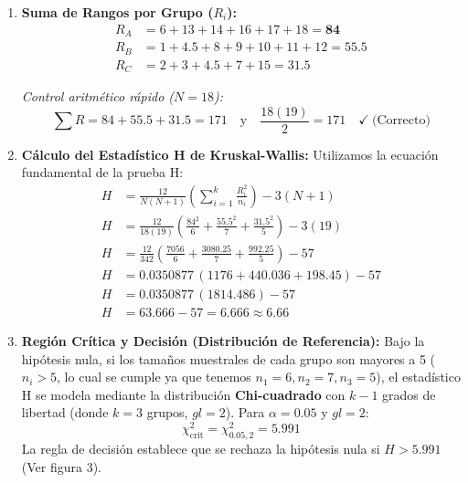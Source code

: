 \documentclass[10pt,a4paper]{article}
\begin{document}
\begin{enumerate}[leftmargin=18pt,itemsep=2pt,topsep=2pt,parsep=0pt]
  \item \textbf{Suma de Rangos por Grupo ($R_i$):}
  \begin{align*}
  R_A &= 6 + 13 + 14 + 16 + 17 + 18 = \mathbf{84} \\
  R_B &= 1 + 4.5 + 8 + 9 + 10 + 11 + 12 = \mathbf{55.5} \\
  R_C &= 2 + 3 + 4.5 + 7 + 15 = \mathbf{31.5}
  \end{align*}

  \textit{Control aritmético rápido ($N = 18$):}
  \[
  \sum R = 84 + 55.5 + 31.5 = 171
  \quad \text{y} \quad
  \frac{18(19)}{2} = 171 \quad \checkmark\ \text{(Correcto)}
  \]

  \item \textbf{Cálculo del Estadístico H de Kruskal-Wallis:} Utilizamos la ecuación fundamental de la prueba H:
  \begin{align*}
  H &= \frac{12}{N(N+1)} \left( \sum_{i=1}^{k} \frac{R_i^2}{n_i} \right) - 3(N+1) \\
  H &= \frac{12}{18(19)} \left( \frac{84^2}{6} + \frac{55.5^2}{7} + \frac{31.5^2}{5} \right) - 3(19) \\
  H &= \frac{12}{342} \left( \frac{7056}{6} + \frac{3080.25}{7} + \frac{992.25}{5} \right) - 57 \\
  H &= 0.0350877\,(1176 + 440.036 + 198.45) - 57 \\
  H &= 0.0350877\,(1814.486) - 57 \\
  H &= 63.666 - 57 = \mathbf{6.666} \approx \mathbf{6.66}
  \end{align*}

  \item \textbf{Región Crítica y Decisión (Distribución de Referencia):} Bajo la hipótesis nula, si los tamaños muestrales de cada grupo son mayores a 5 ($n_i > 5$, lo cual se cumple ya que tenemos $n_1 = 6, n_2 = 7, n_3 = 5$), el estadístico H se modela mediante la distribución \textbf{Chi-cuadrado} con $k-1$ grados de libertad (donde $k = 3$ grupos, $gl = 2$). Para $\alpha = 0.05$ y $gl = 2$:
  \[
  \chi^2_{\text{crit}} = \chi^2_{0.05,2} = \mathbf{5.991}
  \]
  La regla de decisión establece que se rechaza la hipótesis nula si $H > 5.991$ (Ver figura 3).


\end{enumerate}
\end{document}
